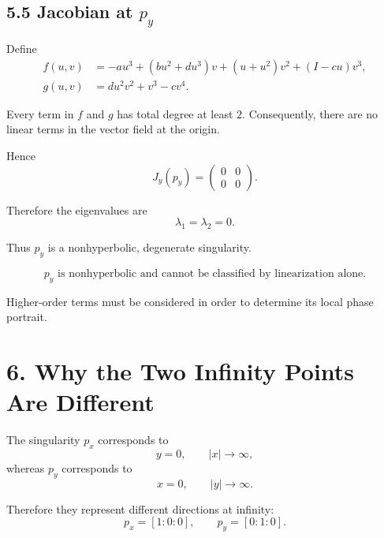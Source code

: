 \documentclass[11pt,a4paper]{article}
\begin{document}
\subsection{5.5 Jacobian at $p_y$}

Define
\begin{align}
f(u,v)
&=
-au^3+(bu^2+du^3)v
+(u+u^2)v^2
+(I-cu)v^3,
\\
g(u,v)
&=
du^2v^2+v^3-cv^4.
\end{align}

Every term in $f$ and $g$ has total degree at least $2$.
Consequently, there are no linear terms in the vector field at the
origin.

Hence
\begin{equation}
\boxed{
J_y(p_y)
=
\begin{pmatrix}
0&0\\
0&0
\end{pmatrix}.
}
\tag{42}
\end{equation}

Therefore the eigenvalues are
\begin{equation}
\boxed{
\lambda_1=\lambda_2=0.
}
\tag{43}
\end{equation}

Thus $p_y$ is a nonhyperbolic, degenerate singularity.

\begin{equation}
\boxed{
p_y\text{ is nonhyperbolic and cannot be classified by linearization alone}.
}
\tag{44}
\end{equation}

Higher-order terms must be considered in order to determine its local
phase portrait.

\section{6. Why the Two Infinity Points Are Different}

The singularity $p_x$ corresponds to
\begin{equation}
y=0,\qquad |x|\to\infty,
\end{equation}
whereas $p_y$ corresponds to
\begin{equation}
x=0,\qquad |y|\to\infty.
\end{equation}

Therefore they represent different directions at infinity:
\begin{equation}
\boxed{
p_x=[1:0:0],
\qquad
p_y=[0:1:0].
}
\end{equation}
\end{document}
